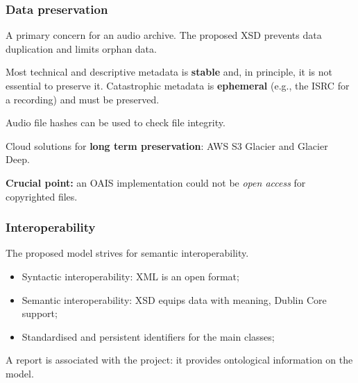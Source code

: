 \documentclass{beamer}
\newcommand\rb[1]{\textcolor{ThemeRed}{\textbf{#1}}}
\begin{document}
  \begin{frame}
    \frametitle{Data preservation}

    A primary concern for an audio archive. The proposed XSD prevents data duplication and limits orphan data.

    \vspace{1em}

    Most technical and descriptive metadata is \rb{stable} and, in principle, it is not essential to preserve it. Catastrophic metadata is \rb{ephemeral} (e.g., the ISRC for a recording) and must be preserved.

    \vspace{1em}

    Audio file hashes can be used to check file integrity.

    \vspace{1em}

    Cloud solutions for \rb{long term preservation}: AWS S3 Glacier and Glacier Deep.
    
    \vspace{1em}

    \rb{Crucial point:} an OAIS implementation could not be \textit{open access} for copyrighted files.

  \end{frame}


  
  \begin{frame}
    \frametitle{Interoperability}

    The proposed model strives for semantic interoperability.

    \vspace{1em}

    \begin{itemize}
      \itemsep0.5em
      \item Syntactic interoperability: XML is an open format;
      \item Semantic interoperability: XSD equips data with meaning, Dublin Core support;
      \item Standardised and persistent identifiers for the main classes;
    \end{itemize}

    \vspace{1em}

    A report is associated with the project: it provides ontological information on the model.
  \end{frame}
\end{document}
